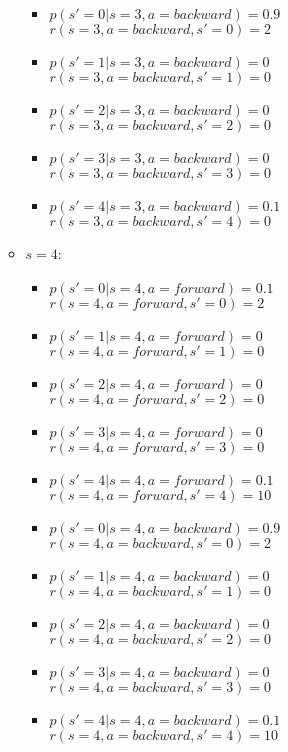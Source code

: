\documentclass[english]{article}
\begin{document}
\begin{enumerate}
\begin{itemize}
\begin{itemize}
\item $p(s' = 0 | s = 3, a = backward) = 0.9$ \\ 
$r(s = 3, a = backward, s' = 0) = 2$ 
\item $p(s' = 1 | s = 3, a = backward) = 0$ \\
$r(s = 3, a = backward, s' = 1) = 0$ 
\item $p(s' = 2 | s = 3, a = backward) = 0$ \\
$r(s = 3, a = backward, s' = 2) = 0$ 
\item $p(s' = 3 | s = 3, a = backward) = 0$ \\
$r(s = 3, a = backward, s' = 3) = 0$ 
\item $p(s' = 4 | s = 3, a = backward) = 0.1$ \\
$r(s = 3, a = backward, s' = 4) = 0$ 
\end{itemize}

\item $s = 4$: 
\begin{itemize}
\item $p(s' = 0 | s = 4, a = forward) = 0.1$   \\ 
$r(s = 4, a = forward, s' = 0) = 2$  
\item $p(s' = 1 | s = 4, a = forward) = 0$ \\ 
$r(s = 4, a = forward, s' = 1) = 0$
\item $p(s' = 2 | s = 4, a = forward) = 0$ \\ 
$r(s = 4, a = forward, s' = 2) = 0$
\item $p(s' = 3 | s = 4, a = forward) = 0$ \\ 
$r(s = 4, a = forward, s' = 3) = 0$
\item $p(s' = 4 | s = 4, a = forward) = 0.1$ \\
$r(s = 4, a = forward, s' = 4) = 10$

\item $p(s' = 0 | s = 4, a = backward) = 0.9$ \\ 
$r(s = 4, a = backward, s' = 0) = 2$ 
\item $p(s' = 1 | s = 4, a = backward) = 0$ \\
$r(s = 4, a = backward, s' = 1) = 0$ 
\item $p(s' = 2 | s = 4, a = backward) = 0$ \\
$r(s = 4, a = backward, s' = 2) = 0$ 
\item $p(s' = 3 | s = 4, a = backward) = 0$ \\
$r(s = 4, a = backward, s' = 3) = 0$ 
\item $p(s' = 4 | s = 4, a = backward) = 0.1$ \\
$r(s = 4, a = backward, s' = 4) = 10$ 
\end{itemize}


\end{itemize}
\end{enumerate}
\end{document}
